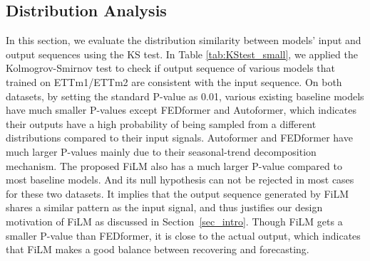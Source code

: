 \documentclass{article}
\begin{document}
\subsection{Distribution Analysis}
In this section, we evaluate the distribution similarity between models' input and output sequences using the KS test. In Table \ref{tab:KStest_small}, we applied the Kolmogrov-Smirnov test to check if output sequence of various models that trained on ETTm1/ETTm2 are consistent with the input sequence. 
On both datasets, by setting the standard P-value as 0.01, various existing baseline models have much smaller P-values except FEDformer and Autoformer, which indicates their outputs have a high probability of being sampled from a different distributions compared to their input signals. Autoformer and FEDformer have much larger P-values mainly due to their seasonal-trend decomposition mechanism. The proposed FiLM also has a much larger P-value compared to most baseline models. And its null hypothesis can not be rejected in most cases for these two datasets. It implies that the output sequence generated by FiLM shares a similar pattern as the input signal, and thus justifies our design motivation of FiLM as discussed in Section~\ref{sec_intro}. Though FiLM gets a smaller P-value than FEDformer, it is close to the actual output, which indicates that FiLM makes a good balance between recovering and forecasting. 

\begin{table}[h]
\centering
\caption{P-values of Kolmogrov-Smirnov test of different Transformer models for long-term forecasting output on ETTm1 and ETTm2 dataset. Larger value indicates the hypothesis (the input sequence and forecasting output come from the same distribution) is less likely to be rejected. The largest results are highlighted.}
\begin{small}
\vskip 0.05in
\label{tab:KStest_small}
\end{small}
\vskip -0.1in
\end{table}
\end{document}

